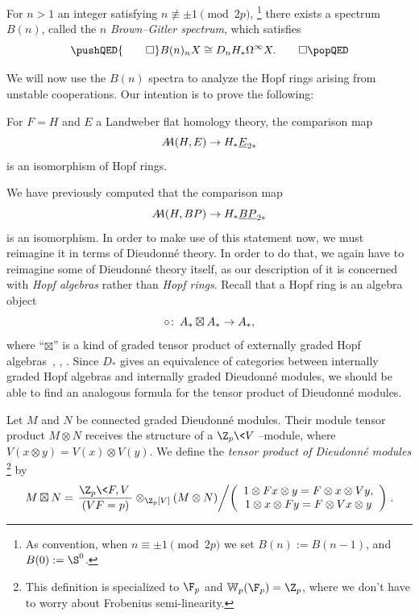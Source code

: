\begin{corollary}\label{BrownGitlerSpectraDefn}
For \(n > 1\) an integer satisfying \(n \not\equiv \pm 1 \pmod{2p}\),%
\footnote{%
As convention, when \(n \equiv \pm 1 \pmod{2p}\) we set \(B(n) := B(n-1)\), and \(B(0) := \S^0\).
}
there exists a spectrum \(B(n)\), called the \(n\){\th} \textit{Brown--Gitler spectrum}, which satisfies \[\pushQED{\qed}B(n)_n X \cong D_n H_* \Loops^\infty X. \qedhere\popQED\]
\end{corollary}


We will now use the \(B(n)\) spectra to analyze the Hopf rings arising from unstable cooperations.
Our intention is to prove the following:
\begin{theorem}\label{LEFTUnstableCooperations}
For \(F = H\) and \(E\) a Landweber flat homology theory, the comparison map \[\AA(H, E) \to H_* \OS{E}{2*}\] is an isomorphism of Hopf rings.
\end{theorem}
\noindent We have previously computed that the comparison map \[\AA(H, BP) \to H_* \OS{BP}{2*}\] is an isomorphism.
In order to make use of this statement now, we must reimagine it in terms of Dieudonn\'e theory.
In order to do that, we again have to reimagine some of Dieudonn\'e theory itself, as our description of it is concerned with \emph{Hopf algebras} rather than \emph{Hopf rings}.
Recall that a Hopf ring is an algebra object \[\circ\colon\thinspace A_* \boxtimes A_* \to A_*,\] where ``\(\boxtimes\)'' is a kind of graded tensor product of externally graded Hopf algebras~\cite[Proposition 2.6]{HuntonTurner}, \cite[Definition 2.2]{BuchstaberLazarev}, \cite[Section 5]{GoerssDieudonne}.
Since \(D_*\) gives an equivalence of categories between internally graded Hopf algebras and internally graded Dieudonn\'e modules, we should be able to find an analogous formula for the tensor product of Dieudonn\'e modules.

\begin{definition}{\cite[pg.\ 154]{GoerssDieudonne}}
Let \(M\) and \(N\) be connected graded Dieudonn\'e modules.
Their module tensor product \(M \otimes N\) receives the structure of a \(\Z_p\<V\>\)--module, where \(V(x \otimes y) = V(x) \otimes V(y)\).
We define the \textit{tensor product of Dieudonn\'e modules}%
\footnote{%
This definition is specialized to \(\F_p\) and \(\mathbb W_p(\F_p) = \Z_p\), where we don't have to worry about Frobenius semi-linearity.
}
by \[M \boxtimes N = \left.\frac{\Z_p\<F, V\>}{(VF = p)} \otimes_{\Z_p[V]} (M \otimes N) \middle/ \left( \begin{array}{c} 1 \otimes Fx \otimes y = F \otimes x \otimes Vy, \\ 1 \otimes x \otimes Fy = F \otimes Vx \otimes y \end{array} \right) \right. .\]
\end{definition}

